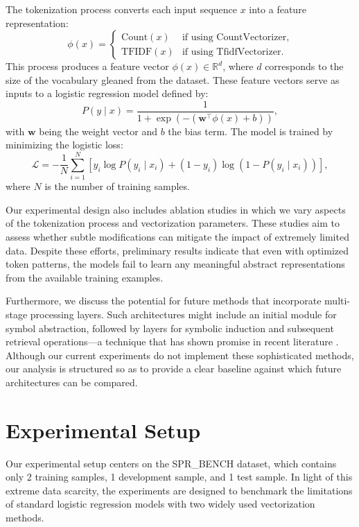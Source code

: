 \documentclass{article}
\begin{document}
The tokenization process converts each input sequence \( x \) into a feature representation:
\[
\phi(x) = 
\begin{cases} 
\text{Count}(x) & \text{if using CountVectorizer}, \\
\text{TFIDF}(x) & \text{if using TfidfVectorizer}.
\end{cases}
\]
This process produces a feature vector \(\phi(x) \in \mathbb{R}^d\), where \(d\) corresponds to the size of the vocabulary gleaned from the dataset. These feature vectors serve as inputs to a logistic regression model defined by:
\[
P(y \mid x) = \frac{1}{1+\exp\left(-\left(\mathbf{w}^\top \phi(x) + b\right)\right)},
\]
with \(\mathbf{w}\) being the weight vector and \(b\) the bias term. The model is trained by minimizing the logistic loss:
\[
\mathcal{L} = -\frac{1}{N}\sum_{i=1}^{N} \left[ y_i \log P(y_i \mid x_i) + (1-y_i) \log \left(1-P(y_i \mid x_i)\right) \right],
\]
where \(N\) is the number of training samples.

Our experimental design also includes ablation studies in which we vary aspects of the tokenization process and vectorization parameters. These studies aim to assess whether subtle modifications can mitigate the impact of extremely limited data. Despite these efforts, preliminary results indicate that even with optimized token patterns, the models fail to learn any meaningful abstract representations from the available training examples.

Furthermore, we discuss the potential for future methods that incorporate multi-stage processing layers. Such architectures might include an initial module for symbol abstraction, followed by layers for symbolic induction and subsequent retrieval operations—a technique that has shown promise in recent literature \cite{symbolic_emergence}. Although our current experiments do not implement these sophisticated methods, our analysis is structured so as to provide a clear baseline against which future architectures can be compared.

\section{Experimental Setup}
Our experimental setup centers on the SPR\_BENCH dataset, which contains only 2 training samples, 1 development sample, and 1 test sample. In light of this extreme data scarcity, the experiments are designed to benchmark the limitations of standard logistic regression models with two widely used vectorization methods.
\end{document}
